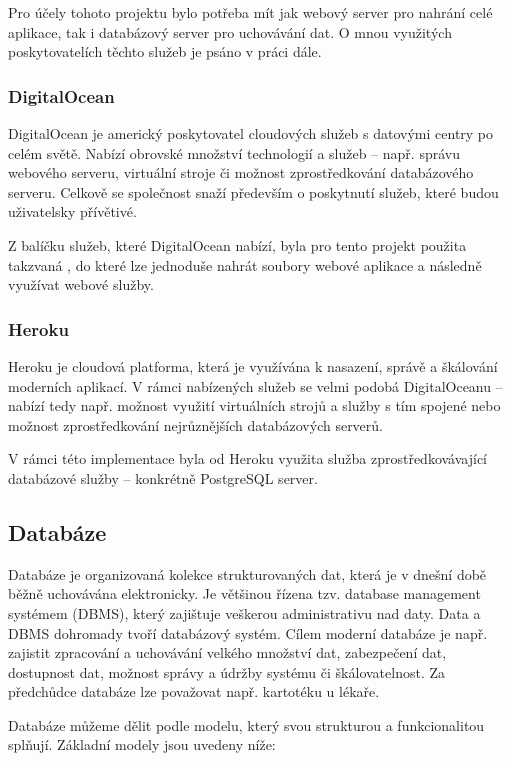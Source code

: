 	Pro účely tohoto projektu bylo potřeba mít jak webový server pro nahrání celé aplikace, tak i databázový server pro uchovávání dat. O mnou využitých poskytovatelích těchto služeb je psáno v práci dále. 
	
		\subsubsection{DigitalOcean}
		DigitalOcean je americký poskytovatel cloudových služeb s datovými centry po celém světě. Nabízí obrovské množství technologií a služeb – např. správu webového serveru, virtuální stroje či možnost zprostředkování databázového serveru. Celkově se společnost snaží především o poskytnutí služeb, které budou uživatelsky přívětivé. \cite{DO1} \cite{DO2}
		
		Z balíčku služeb, které DigitalOcean nabízí, byla pro tento projekt použita takzvaná  \cite{DO3}, do které lze jednoduše nahrát soubory webové aplikace a následně využívat webové služby.
		
		\subsubsection{Heroku}
		Heroku je cloudová platforma, která je využívána k nasazení, správě a škálování moderních aplikací. V rámci nabízených služeb se velmi podobá DigitalOceanu – nabízí tedy např. možnost využití virtuálních strojů a služby s tím spojené nebo možnost zprostředkování nejrůznějších databázových serverů. \cite{Heroku1} \cite{Heroku2}
		
		V rámci této implementace byla od Heroku využita služba zprostředkovávající databázové služby – konkrétně PostgreSQL server. 
		
	\subsection{Databáze}
	Databáze je organizovaná kolekce strukturovaných dat, která je v dnešní době běžně uchovávána elektronicky. Je většinou řízena tzv. database management systémem (DBMS), který zajištuje veškerou administrativu nad daty. Data a DBMS dohromady tvoří databázový systém. Cílem moderní databáze je např. zajistit zpracování a uchovávání velkého množství dat, zabezpečení dat, dostupnost dat, možnost správy a údržby systému či škálovatelnost. Za předchůdce databáze lze považovat např. kartotéku u lékaře. \cite{DBSummary}
	
	Databáze můžeme dělit podle modelu, který svou strukturou a funkcionalitou splňují. Základní modely jsou uvedeny níže: \cite{DBModel}
		
